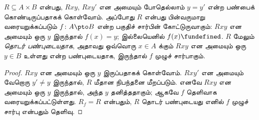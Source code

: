 \documentclass[../../../include/open-logic-section]{subfiles}
\begin{document}
\begin{prop}
$R \subseteq A \times B$ என்பது, $Rxy$, $Rxy'$ என அமையும்
போதெல்லாம் $y = y'$ என்ற பண்பைக் கொண்டிருப்பதாகக் கொள்வோம்.
அப்போது $R$ என்பது பின்வருமாறு வரையறுக்கப்படும்
$f\colon A \pto B$ என்ற பகுதிச் சார்பின் கோட்டுருவாகும்:
$Rxy$ என அமையும் ஒரு $y$ இருந்தால் $f(x) = y$;
இல்லையெனில் $f(x) \fundefined$.
$R$ மேலும் \emph{தொடர் பண்புடையதாக}, அதாவது ஒவ்வொரு
$x \in A$ க்கும் $Rxy$ என அமையும் ஒரு $y \in B$ உள்ளது
என்ற பண்புடையதாக, இருந்தால் $f$ முழுச் சார்பாகும்.
\end{prop}

\begin{proof}
$Rxy$ என அமையும் ஒரு $y$ இருப்பதாகக் கொள்வோம்.
$Rxy'$ என அமையும் வேறொரு $y'
\neq y$ இருந்தால், $R$ மீதான நிபந்தனை மீறப்படும்.
எனவே $Rxy$ என அமையும் ஒரு $y$ இருந்தால், அந்த $y$ தனித்ததாகும்;
ஆகவே $f$ தெளிவாக வரையறுக்கப்பட்டுள்ளது.
$R_f = R$ என்பதும், $R$ தொடர் பண்புடையது எனில் $f$ முழுச் சார்பு
என்பதும் தெளிவு.
\end{proof}
\end{document}

